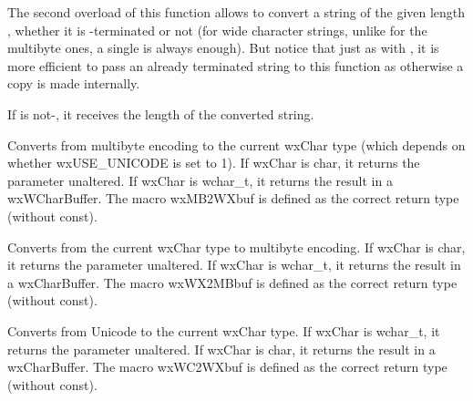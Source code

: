 The second overload of this function allows to convert a string of the given
length , whether it is \NUL-terminated or not (for wide character
strings, unlike for the multibyte ones, a single \NUL is always enough).
But notice that just as with , it is more
efficient to pass an already terminated string to this function as otherwise a
copy is made internally.

If  is not-\NULL, it receives the length of the converted
string.


\label{wxmbconvcmb2wx}



Converts from multibyte encoding to the current wxChar type
(which depends on whether wxUSE\_UNICODE is set to 1). If wxChar is char,
it returns the parameter unaltered. If wxChar is wchar\_t, it returns the
result in a wxWCharBuffer. The macro wxMB2WXbuf is defined as the correct
return type (without const).


\label{wxmbconvcwx2mb}



Converts from the current wxChar type to multibyte encoding. If wxChar is char,
it returns the parameter unaltered. If wxChar is wchar\_t, it returns the
result in a wxCharBuffer. The macro wxWX2MBbuf is defined as the correct
return type (without const).


\label{wxmbconvcwc2wx}



Converts from Unicode to the current wxChar type. If wxChar is wchar\_t,
it returns the parameter unaltered. If wxChar is char, it returns the
result in a wxCharBuffer. The macro wxWC2WXbuf is defined as the correct
return type (without const).


\label{wxmbconvcwx2wc}


